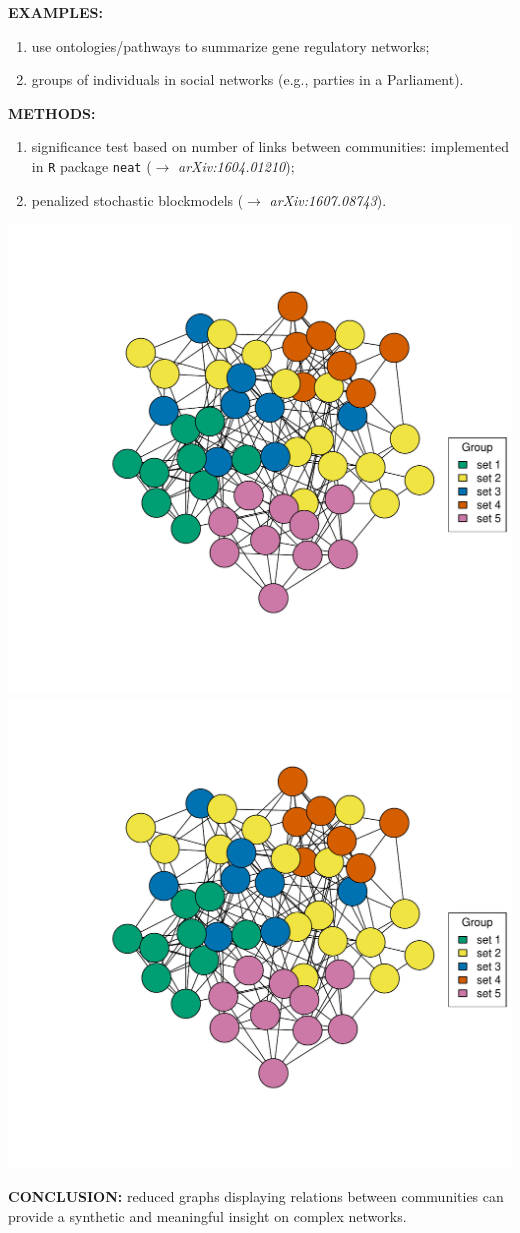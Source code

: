 \documentclass[a0paper,portrait]{baposter}
\begin{document}
\begin{poster}
{	\vspace{0.1cm}
	\textbf{EXAMPLES:}\\\vspace{-0.65cm}
	\begin{enumerate}
		\itemsep-3pt
		\item use ontologies/pathways to summarize gene regulatory networks;
		\item groups of individuals in social networks \small{(e.g., parties in a Parliament)}.
	\end{enumerate}\vspace{-0.1cm}
	\textbf{METHODS:}\\\vspace{-0.65cm}
	\begin{enumerate}
		\itemsep-3pt
		\item significance test based on number of links between communities: implemented in \texttt{R} package \texttt{neat} ($\rightarrow$ \textit{arXiv:1604.01210});
		\item penalized stochastic blockmodels ($\rightarrow$ \textit{arXiv:1607.08743}).
	\end{enumerate}
	\begin{center}
		\includegraphics[width=0.4\linewidth, page=1, trim=0cm 3cm 0cm 3cm]{example-mirko.pdf}
		\includegraphics[width=0.4\linewidth, page=2, trim=0cm 3cm 0cm 3cm]{example-mirko.pdf}
	\end{center}
	\vspace{-0.3cm}
	\textbf{CONCLUSION:} reduced graphs displaying relations between communities can provide a synthetic and meaningful insight on complex networks.
	
}
\end{poster}
\end{document}
